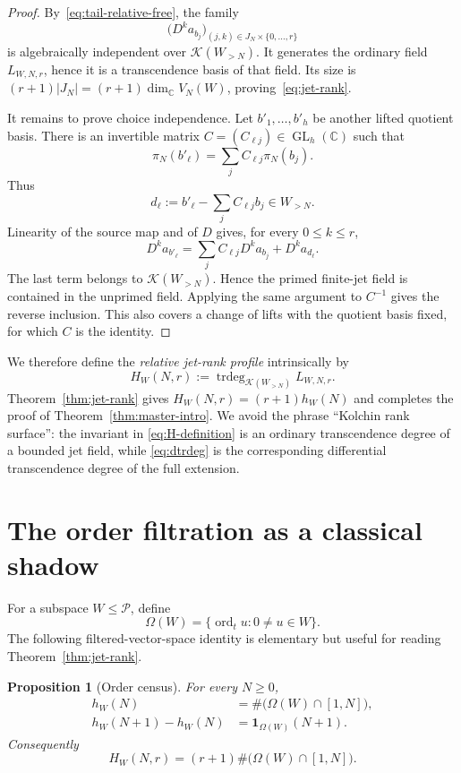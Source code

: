 \documentclass[11pt]{article}
\newtheorem{proposition}[theorem]{Proposition}
\theoremstyle{definition}
\theoremstyle{remark}
\newcommand{\C}{\mathbb C}
\newcommand{\Pcal}{\mathcal P}
\newcommand{\K}{\mathcal K}
\newcommand{\ord}{\operatorname{ord}}
\newcommand{\trdeg}{\operatorname{trdeg}}
\begin{document}
\begin{proof}
By~\eqref{eq:tail-relative-free}, the family
\[
 \bigl(D^ka_{b_j}\bigr)_{(j,k)\in J_N\times\{0,\ldots,r\}}
\]
is algebraically independent over $\K(W_{>N})$.  It generates the ordinary field
$L_{W,N,r}$, hence it is a transcendence basis of that field.  Its size is
$(r+1)|J_N|=(r+1)\dim_\C V_N(W)$, proving~\eqref{eq:jet-rank}.

It remains to prove choice independence.  Let $b'_1,\ldots,b'_h$ be another lifted quotient
basis.  There is an invertible matrix $C=(C_{\ell j})\in\operatorname{GL}_h(\C)$ such that
\[
 \pi_N(b'_\ell)=\sum_jC_{\ell j}\pi_N(b_j).
\]
Thus
\[
 d_\ell:=b'_\ell-\sum_jC_{\ell j}b_j\in W_{>N}.
\]
Linearity of the source map and of $D$ gives, for every $0\le k\le r$,
\begin{equation}\label{eq:jet-change-basis}
 D^ka_{b'_\ell}=\sum_jC_{\ell j}D^ka_{b_j}+D^ka_{d_\ell}.
\end{equation}
The last term belongs to $\K(W_{>N})$.  Hence the primed finite-jet field is contained in the
unprimed field.  Applying the same argument to $C^{-1}$ gives the reverse inclusion.  This also
covers a change of lifts with the quotient basis fixed, for which $C$ is the identity.
\end{proof}

We therefore define the \emph{relative jet-rank profile} intrinsically by
\begin{equation}\label{eq:H-definition}
 H_W(N,r):=\trdeg_{\K(W_{>N})}L_{W,N,r}.
\end{equation}
Theorem~\ref{thm:jet-rank} gives $H_W(N,r)=(r+1)h_W(N)$ and completes the proof of
Theorem~\ref{thm:master-intro}.  We avoid the phrase ``Kolchin rank surface'': the invariant in
\eqref{eq:H-definition} is an ordinary transcendence degree of a bounded jet field, while
\eqref{eq:dtrdeg} is the corresponding differential transcendence degree of the full extension.

\section{The order filtration as a classical shadow}\label{sec:order-shadow}

For a subspace $W\le\Pcal$, define
\[
 \Omega(W)=\{\ord_tu:0\ne u\in W\}.
\]
The following filtered-vector-space identity is elementary but useful for reading
Theorem~\ref{thm:jet-rank}.

\begin{proposition}[Order census]\label{prop:order-census}
For every $N\ge0$,
\begin{align}
 h_W(N)&=\#\bigl(\Omega(W)\cap[1,N]\bigr),                \label{eq:order-census}\\
 h_W(N+1)-h_W(N)&=\mathbf 1_{\Omega(W)}(N+1).             \label{eq:order-jump}
\end{align}
Consequently
\begin{equation}\label{eq:jet-order-census}
 H_W(N,r)=(r+1)\#\bigl(\Omega(W)\cap[1,N]\bigr).
\end{equation}
\end{proposition}
\end{document}
